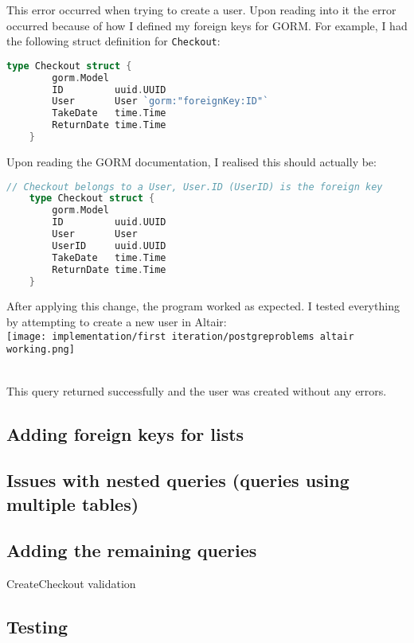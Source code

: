 \documentclass[../../main.tex]{subfiles}
\begin{document}
\noindent This error occurred when trying to create a user. Upon reading into it the error occurred because of how I defined my foreign keys for GORM. For example, I had the following struct definition for \lstinline{Checkout}:

\begin{lstlisting}[language=Go]
    type Checkout struct {
        gorm.Model
        ID         uuid.UUID
        User       User `gorm:"foreignKey:ID"`
        TakeDate   time.Time
        ReturnDate time.Time
    }
    \end{lstlisting}

\noindent Upon reading the GORM documentation, I realised this should actually be:

\begin{lstlisting}[language=Go]
    // Checkout belongs to a User, User.ID (UserID) is the foreign key
    type Checkout struct {
        gorm.Model
        ID         uuid.UUID
        User       User
        UserID     uuid.UUID
        TakeDate   time.Time
        ReturnDate time.Time
    }
    \end{lstlisting}

\noindent After applying this change, the program worked as expected. I tested everything by attempting to create a new user in Altair:\\

\texttt{[image: implementation/first iteration/postgreproblems altair working.png]}

\noindent \\ This query returned successfully and the user was created without any errors.

\subsection{Adding foreign keys for lists}

\subsection{Issues with nested queries (queries using multiple tables)}

\subsection{Adding the remaining queries}

CreateCheckout validation

\subsection{Testing}
\end{document}

